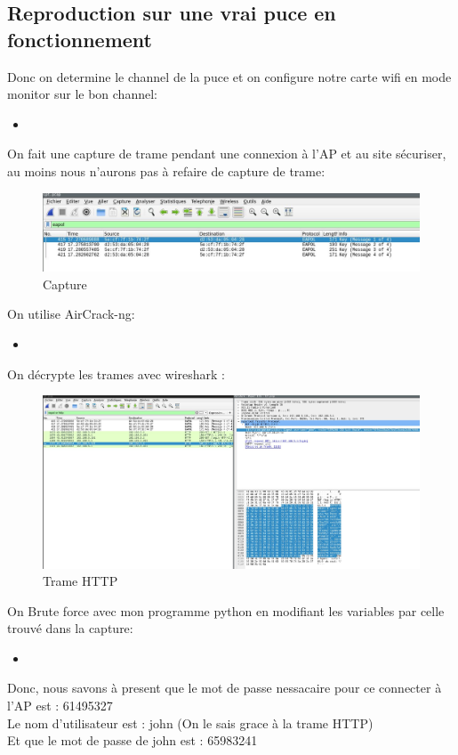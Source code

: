 \documentclass[10pt,a4paper]{article}
\newcommand{\insertcode}[2]{\begin{itemize}\item[]\end{itemize}}
\begin{document}
\subsection{Reproduction sur une vrai puce en fonctionnement}
Donc on determine le channel de la puce et on configure notre carte wifi en mode monitor sur le bon channel:
\insertcode{code/puce/1}{Setup}
On fait une capture de trame pendant une connexion à l'AP et au site sécuriser, au moins nous n'aurons pas à refaire de capture de trame:
\begin{figure}[h!]
\centering
\includegraphics[scale=0.500]{image/8.jpg}
\caption{Capture}
\label{fig:net }
\end{figure}
On utilise AirCrack-ng:
\insertcode{code/puce/2}{AirCrack}
On décrypte les trames avec wireshark :
\begin{figure}[h!]
\centering
\includegraphics[scale=0.250]{image/9.jpg}
\caption{Trame HTTP}
\label{fig:net }
\end{figure}
On Brute force avec mon programme python en modifiant les variables par celle trouvé dans la capture:
\insertcode{manip/puce/digest_authAP2.py}{Le code est 65983241}
Donc, nous savons à present que le mot de passe nessacaire pour ce connecter à l'AP est : 61495327\\
Le nom d'utilisateur est : john (On le sais grace à la trame HTTP)\\
Et que le mot de passe de john est : 65983241 
\end{document}
